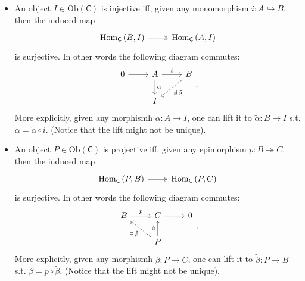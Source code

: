 \documentclass[../Main]{subfiles}
\begin{document}
\begin{rem}[]\leavevmode\vspace{-.2\baselineskip}
	\begin{itemize}
		\item An object $I \in \mathrm{Ob} \left(\mathsf{C}\right)$ is injective iff,
	given any monomorphism $i:A \hookrightarrow B$, then
	the induced map
	\begin{equation}
	\begin{tikzcd}
		\mathrm{Hom}_{\mathsf{C}} \left( B, I \right) \arrow[r, "", twoheadrightarrow] &
		\mathrm{Hom}_{\mathsf{C}} \left( A, I \right)
	\end{tikzcd}
	\end{equation} 
	is surjective.
	In other words the following diagram commutes:
	\begin{equation}
	\begin{tikzcd}
		0 \arrow[r, "", rightarrow] &
		A \arrow[r, "i", rightarrow] \arrow[d, "\alpha", rightarrow] &
		B \arrow[ld, "\exists\, \tilde{\alpha}", dashrightarrow] \\
		&
		I &
	\end{tikzcd}
	.\end{equation} 
	More explicitly, given any morphismh $\alpha\colon A \to I$,
	one can lift it to $\tilde{\alpha}\colon B \to I$ s.t.
	$\alpha = \tilde{\alpha} \circ i$.
	(Notice that the lift might not be unique).

		\item An object $P \in \mathrm{Ob} \left(\mathsf{C}\right)$ is projective iff,
	given any epimorphism $p:B \twoheadrightarrow C$, then
	the induced map
	\begin{equation}
	\begin{tikzcd}
		\mathrm{Hom}_{\mathsf{C}} \left( P, B \right) \arrow[r, "", twoheadrightarrow] &
		\mathrm{Hom}_{\mathsf{C}} \left( P, C \right)
	\end{tikzcd}
	\end{equation} 
	is surjective.
	In other words the following diagram commutes:
	\begin{equation}
	\begin{tikzcd}
		B \arrow[r, "p", rightarrow] &
		C \arrow[r, "", rightarrow] &
		0\\
		&
		P \arrow[u, "\beta", rightarrow] \arrow[ul, "\exists\, \tilde{\beta}", dashrightarrow] &
	\end{tikzcd}
	.\end{equation} 
	More explicitly, given any morphismh $\beta\colon P \to C$,
	one can lift it to $\tilde{\beta}\colon P \to B$ s.t.
	$\beta = p \circ \tilde{\beta}$.
	(Notice that the lift might not be unique).
	\end{itemize}
\end{rem}
\end{document}
